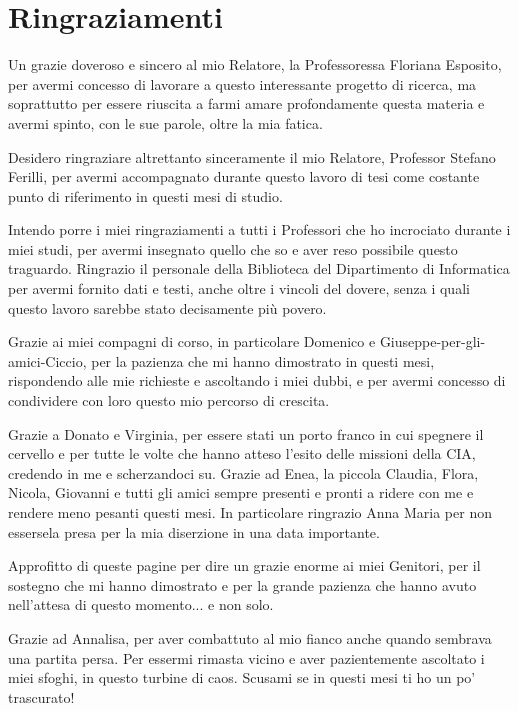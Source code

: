 \chapter*{Ringraziamenti}
\rhead{}

Un grazie doveroso e sincero al mio Relatore, la Professoressa Floriana Esposito, per avermi concesso di lavorare a questo interessante progetto di ricerca, ma soprattutto per essere riuscita a farmi amare profondamente questa materia e avermi spinto, con le sue parole, oltre la mia fatica. 

Desidero ringraziare altrettanto sinceramente il mio Relatore, Professor Stefano Ferilli, per avermi accompagnato durante questo lavoro di tesi come costante punto di riferimento in questi mesi di studio.

Intendo porre i miei ringraziamenti a tutti i Professori che ho incrociato durante i miei studi, per avermi insegnato quello che so e aver reso possibile questo traguardo. Ringrazio il personale della Biblioteca del Dipartimento di Informatica per avermi fornito dati e testi, anche oltre i vincoli del dovere, senza i quali questo lavoro sarebbe stato decisamente più povero.

Grazie ai miei compagni di corso, in particolare Domenico e Giuseppe-per-gli-amici-Ciccio, per la pazienza che mi hanno dimostrato in questi mesi, rispondendo alle mie richieste e ascoltando i miei dubbi, e per avermi concesso di condividere con loro questo mio percorso di crescita.

Grazie a Donato e Virginia, per essere stati un porto franco in cui spegnere il cervello e per tutte le volte che hanno atteso l'esito delle missioni della CIA, credendo in me e scherzandoci su. Grazie ad Enea, la piccola Claudia, Flora, Nicola, Giovanni e tutti gli amici sempre presenti e pronti a ridere con me e rendere meno pesanti questi mesi. In particolare ringrazio Anna Maria per non essersela presa per la mia diserzione in una data importante.

Approfitto di queste pagine per dire un grazie enorme ai miei Genitori, per il sostegno che mi hanno dimostrato e per la grande pazienza che hanno avuto nell'attesa di questo momento... e non solo.

Grazie ad Annalisa, per aver combattuto al mio fianco anche quando sembrava una partita persa. Per essermi rimasta vicino e aver pazientemente ascoltato i miei sfoghi, in questo turbine di caos. Scusami se in questi mesi ti ho un po' trascurato!

